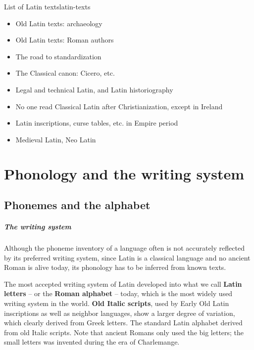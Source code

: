 \documentclass[a4paper, oneside, 12pt]{report}
\newcommand*{\concept}[1]{\textbf{#1}}
\begin{document}
\begin{todobox}{List of Latin texts}{latin-texts}
 \begin{itemize}
    \item Old Latin texts: archaeology
    \item Old Latin texts: Roman authors
    \item The road to standardization
    \item The Classical canon: Cicero, etc.
    \item Legal and technical Latin, and Latin historiography
    \item No one read Classical Latin after Christianization, except in Ireland
    \item Latin inscriptions, curse tables, etc. in Empire period
    \item Medieval Latin, Neo Latin
\end{itemize}
   
\end{todobox}

\chapter{Phonology and the writing system}

\section{Phonemes and the alphabet}

\paragraph*{The writing system}
Although the phoneme inventory of a language 
often is not accurately reflected by its preferred writing system, 
since Latin is a classical language 
and no ancient Roman is alive today, 
its phonology has to be inferred from known texts. 

The most accepted writing system of Latin developed into 
what we call \concept{Latin letters} -- or the \concept{Roman alphabet} -- today, 
which is the most widely used writing system in the world.
\concept{Old Italic scripts},
used by Early Old Latin inscriptions 
as well as neighbor languages,
show a larger degree of variation, 
which clearly derived from Greek letters.
The standard Latin alphabet derived from old Italic scripts.
Note that ancient Romans only used the big letters;
the small letters was invented during the era of Charlemange.
\end{document}
